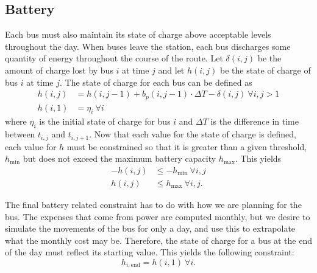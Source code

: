 \subsection{Battery}
\par Each bus must also maintain its state of charge above acceptable levels throughout the day.  When buses leave the station, each bus discharges some quantity of energy throughout the course of the route. Let $\delta(i,j)$ be the amount of charge lost by bus $i$ at time $j$ and let $h(i,j)$ be the state of charge of bus $i$ at time $j$. The state of charge for each bus can be defined as
\begin{equation}\label{eqn:battery:socPropagation}\begin{aligned}
	h(i,j) &= h(i,j-1) + b_p(i,j - 1)\cdot \Delta T - \delta(i,j) \ \forall i,j>1 \\
	h(i,1) &= \eta_i \ \forall i
\end{aligned}\end{equation}
where $\eta_i$ is the initial state of charge for bus $i$ and $\Delta T$ is the difference in time between $t_{i,j}$ and $t_{i,j+1}$.
Now that each value for the state of charge is defined, each value for $h$ must be constrained so that it is greater than a given threshold, $h_{\text{min}}$ but does not exceed the maximum battery capacity $h_{\text{max}}$. This yields
\begin{equation} \label{eqn:battery:soc}\begin{aligned}
	-h(i,j) &\le -h_{\text{min}}\ \forall i,j \\
	h(i,j) &\le h_{\text{max}} \ \forall i,j. 
\end{aligned}\end{equation}
\par The final battery related constraint has to do with how we are planning for the bus.  The expenses that come from power are computed monthly, but we desire to simulate the movements of the bus for only a day, and use this to extrapolate what the monthly cost may be.  Therefore, the state of charge for a bus at the end of the day must reflect its starting value.  This yields the following constraint:
\begin{equation}\label{eqn:battery:busPower}
	h_{i,\text{end}} = h(i,1) \ \forall i.
\end{equation}

